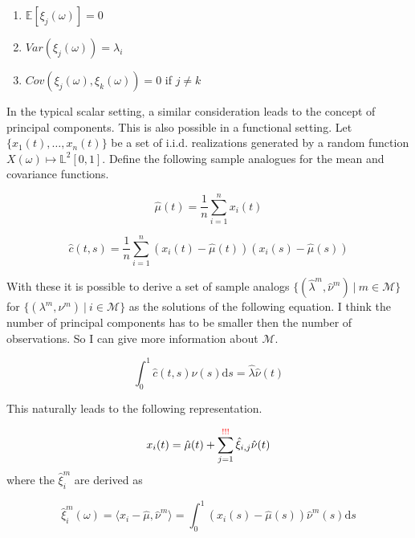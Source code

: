 \documentclass[11pt,twoside,a4paper]{article}
\begin{document}
	\begin{multicols}{2}
		\begin{enumerate}
			\item $\mathbb{E}\left[\xi_j(\omega)\right] = 0$
			\item $Var\left(\xi_j(\omega)\right) = \lambda_i$
			\item $Cov\left(\xi_j(\omega), \xi_k(\omega)\right) = 0$ if $j \neq k$
		\end{enumerate}
	\end{multicols}
	
	In the typical scalar setting, a similar consideration leads to the concept of principal components. This is also possible in a functional setting. Let $\{x_1(t), \dots, x_n(t)\}$ be a set of i.i.d. realizations generated by a random function $X(\omega) \mapsto \mathbb{L}^2[0,1]$.
	Define the following sample analogues for the mean and covariance functions.
	
	\begin{equation}
		\hat{\mu}(t) = \frac{1}{n}\sum_{i = 1}^{n}x_i(t)
	\end{equation}

	\begin{equation}
		\hat{c}(t,s) = \frac{1}{n} \sum_{i = 1}^{n} \left(x_i(t) - \hat{\mu}(t)\right) \left(x_i(s) - \hat{\mu}(s)\right)
	\end{equation}

	With these it is possible to derive a set of sample analogs $\{(\hat{\lambda}^m, \hat{\nu}^m) \: \vert \: m \in \mathcal{M}\}$ for $\{(\lambda^m, \nu^m) \: \vert \: i \in \mathcal{M}\}$ as the solutions of the following equation. {\color{red} I think the number of principal components has to be smaller then the number of observations. So I can give more information about $\mathcal{M}$.}
	
	\begin{equation}
		\int_{0}^{1}\hat{c}(t,s)\hat{\nu}(s) \mathrm{d}s = \hat{\lambda} \hat{\nu}(t)
	\end{equation}
	
	This naturally leads to the following representation.
	
	\begin{equation}
		x_i(t) = \hat{\mu}(t) + \sum_{j = 1}^{{\color{red} !!!}} \hat{\xi}_{i,j} \hat{\nu}(t)
	\end{equation}
	where the $\hat{\xi}_{i}^m$ are derived as 
	
	\begin{equation}
		\hat{\xi}_i^m(\omega) = \langle x_i - \hat{\mu}, \hat{\nu}^m\rangle = \int_{0}^{1} \left(x_i(s) - \hat{\mu}(s)\right) \hat{\nu}^m(s) \mathrm{d}s
	\end{equation}
	
\end{document}
